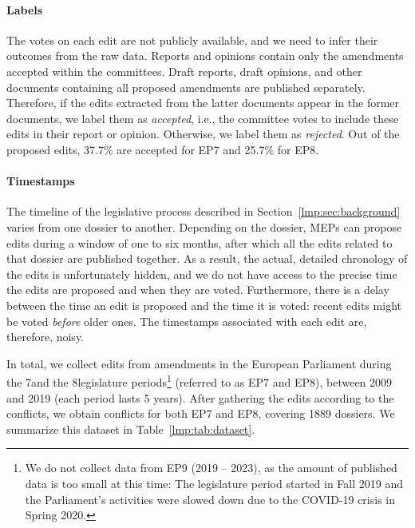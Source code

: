 \paragraph{Labels}
The votes on each edit are not publicly available, and we need to infer their outcomes from the raw data.
Reports and opinions contain only the amendments accepted within the committees.
Draft reports, draft opinions, and other documents containing all proposed amendments are published separately.
Therefore, if the edits extracted from the latter documents  appear in the former documents, we label them as \emph{accepted}, i.e., the committee votes to include these edits in their report or opinion.
Otherwise, we label them as \emph{rejected}.
Out of the proposed edits, 37.7\% are accepted for EP7 and 25.7\% for EP8.

\paragraph{Timestamps}
The timeline of the legislative process described in Section~\ref{lmp:sec:background} varies from one dossier to another.
Depending on the dossier, MEPs can propose edits during a window of one to six months, after which all the edits related to that dossier are published together.
As a result, the actual, detailed chronology of the edits is unfortunately hidden, and we do not have access to the precise time the edits are proposed and when they are voted.
Furthermore, there is a delay between the time an edit is proposed and the time it is voted: recent edits might be voted \emph{before} older ones.
The timestamps associated with each edit are, therefore, noisy.



In total, we collect  edits from  amendments in the European Parliament during the 7\th and the 8\th legislature periods\footnote{We do not collect data from EP9 (2019 -- 2023), as the amount of published data is too small at this time: The legislature period started in Fall 2019 and the Parliament's activities were slowed down due to the COVID-19 crisis in Spring 2020.} (referred to as EP7 and EP8), between 2009 and 2019 (each period lasts 5 years).
After gathering the edits according to the conflicts, we obtain  conflicts for both EP7 and EP8, covering 1889 dossiers.
We summarize this dataset in Table~\ref{lmp:tab:dataset}.

